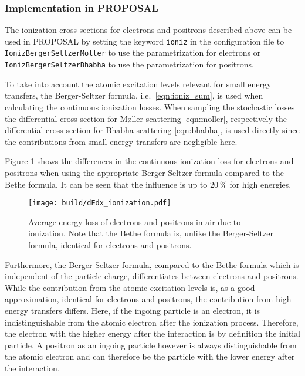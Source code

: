 \subsubsection{Implementation in PROPOSAL}


\begin{sloppypar}
The ionization cross sections for electrons and positrons described above can be used in PROPOSAL by setting the keyword \texttt{ioniz} in the configuration file to \texttt{IonizBergerSeltzerMoller} to use the parametrization for electrons or \texttt{IonizBergerSeltzerBhabha} to use the parametrization for positrons. 
\end{sloppypar}

To take into account the atomic excitation levels relevant for small energy transfers, the Berger-Seltzer formula, i.e.\ \eqref{eqn:ioniz_sum}, is used when calculating the continuous ionization losses.
When sampling the stochastic losses the differential cross section for M{\o}ller scattering \eqref{eqn:moller}, respectively the differential cross section for Bhabha scattering \eqref{eqn:bhabha}, is used directly since the contributions from small energy transfers are negligible here.

Figure \ref{fig:dEdx_ionization} shows the differences in the continuous ionization loss for electrons and positrons when using the appropriate Berger-Seltzer formula compared to the Bethe formula.
It can be seen that the influence is up to $\SI{20}{\percent}$ for high energies.
%
\begin{figure}
    \centering
    \texttt{[image: build/dEdx\_ionization.pdf]}
    \caption{Average energy loss of electrons and positrons in air due to ionization. Note that the Bethe formula is, unlike the Berger-Seltzer formula, identical for electrons and positrons.}
    \label{fig:dEdx_ionization}
\end{figure}
%
Furthermore, the Berger-Seltzer formula, compared to the Bethe formula which is independent of the particle charge, differentiates between electrons and positrons.
While the contribution from the atomic excitation levels is, as a good approximation, identical for electrons and positrons, the contribution from high energy transfers differs.
Here, if the ingoing particle is an electron, it is indistinguishable from the atomic electron after the ionization process.
Therefore, the electron with the higher energy after the interaction is by definition the initial particle.
A positron as an ingoing particle however is always distinguishable from the atomic electron and can therefore be the particle with the lower energy after the interaction.


